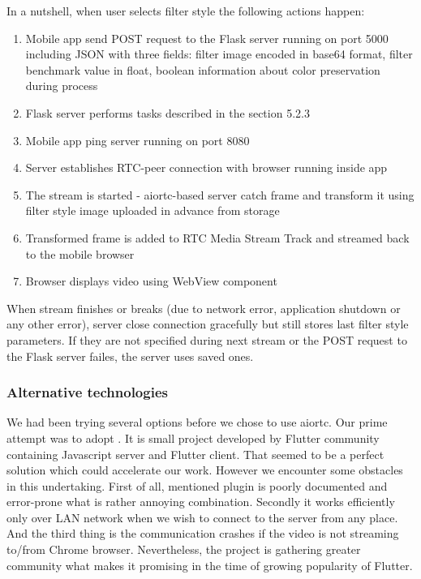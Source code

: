 \documentclass[../Main.tex]{subfiles}
\begin{document}
    In a nutshell, when user selects filter style the following actions happen:
    \begin{enumerate}
    \item Mobile app send POST request to the Flask server running on port 5000 including JSON with three fields: filter image encoded in base64 format, filter benchmark value in float, boolean information about color preservation during process 
    \item Flask server performs tasks described in the section 5.2.3
    \item Mobile app ping server running on port 8080
    \item Server establishes RTC-peer connection with browser running inside app
    \item The stream is started - aiortc-based server catch frame and transform it using filter style image uploaded in advance from storage
    \item Transformed frame is added to RTC Media Stream Track and streamed back to the mobile browser
    \item Browser displays video using WebView component 
    \end{enumerate}
    
    When stream finishes or breaks (due to network error, application shutdown or any other error), server close connection gracefully but still stores last filter style parameters. If they are not specified during next stream or the POST request to the Flask server failes, the server uses saved ones. 
    
    \subsubsection{Alternative technologies}
    We had been trying several options before we chose to use aiortc. Our prime attempt was to adopt . It is small project developed by Flutter community containing Javascript server and Flutter client. That seemed to be a perfect solution which could accelerate our work.
    However we encounter some obstacles in this undertaking. First of all, mentioned plugin is poorly documented and error-prone what is rather annoying combination. Secondly it works efficiently only over LAN network when we wish to connect to the server from any place. And the third thing is the communication crashes if the video is not streaming to/from Chrome browser. Nevertheless, the project is gathering greater community what makes it promising in the time of growing popularity of Flutter.
    
\end{document}
